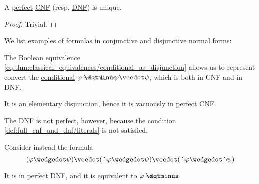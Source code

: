 \begin{proposition}\label{thm:full_cnf_and_dnf_uniqueness}
  A \hyperref[def:full_cnf_and_dnf]{perfect} \hyperref[def:cnf_and_dnf]{CNF} (resp. \hyperref[def:cnf_and_dnf]{DNF}) is unique.
\end{proposition}
\begin{proof}
  Trivial.
\end{proof}

\begin{example}\label{ex:def:cnf_and_dnf}
  We list examples of formulas in \hyperref[def:cnf_and_dnf]{conjunctive and disjunctive normal forms}:
  \begin{thmenum}
     The \hyperref[thm:classical_equivalences]{Boolean equivalence} \eqref{eq:thm:classical_equivalences/conditional_as_disjunction} allows us to represent convert the \hyperref[def:propositional_alphabet/connectives/conditional]{conditional} \( \varphi \synimplies \psi \) to \( \synneg \varphi \synvee \psi \), which is both in CNF and in DNF.

    It is an elementary disjunction, hence it is vacuously in perfect CNF.

    The DNF is not perfect, however, because the condition \cref{def:full_cnf_and_dnf/literals} is not satisfied.

     Consider instead the formula
    \begin{equation*}
      (\varphi \synwedge \psi) \synvee (\synneg \varphi \synwedge \psi) \synvee (\synneg \varphi \synwedge \synneg \psi)
    \end{equation*}

    It is in perfect DNF, and it is equivalent to \( \varphi \synimplies \psi \).
  \end{thmenum}
\end{example}

